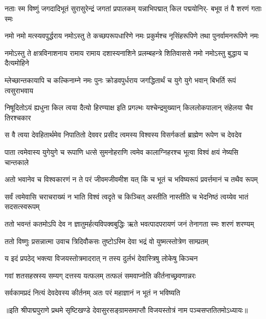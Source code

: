 
\addtocounter{shlokacount}{88}

\fourlineindentedshloka
{नताः स्म विष्णुं जगदादिभूतं}
{सुरासुरेन्द्रं जगतां प्रपालकम्}
{यन्नाभिपद्मात् किल पद्मयोनिर्-}
{बभूव तं वै शरणं गताः स्मः} %

\fourlineindentedshloka
{नमो नमो मत्स्यवपुर्द्धराय}
{नमोऽस्तु ते कच्छपरूपधारिणे}
{नमः प्रकुर्मश्च नृसिंहरूपिणे}
{तथा पुनर्वामनरूपिणे नमः} %

\fourlineindentedshloka
{नमोऽस्तु ते क्षत्रविनाशनाय}
{रामाय रामाय दशास्यनाशिने}
{प्रलम्बहन्त्रे शितिवाससे नमो}
{नमोऽस्तु बुद्धाय च दैत्यमोहिने} %

\fourlineindentedshloka
{म्लेच्छान्तकायापि च कल्किनाम्ने}
{नमः पुनः क्रोडवपुर्धराय}
{जगद्धितार्थं च युगे युगे भवान्}
{बिभर्ति रूपं त्वसुराभवाय} %

\fourlineindentedshloka
{निषूदितोऽयं ह्यधुना किल त्वया}
{दैत्यो हिरण्याक्ष इति प्रगल्भः}
{यश्चेन्द्रमुख्यान् किललोकपालान्}
{संहेलया चैव तिरश्चकार} %

\fourlineindentedshloka
{स वै त्वया देवहितार्थमेव}
{निपातितो देववर प्रसीद}
{त्वमस्य विश्वस्य विसर्गकर्ता}
{ब्राह्मेण रूपेण च देवदेव} %

\fourlineindentedshloka
{पाता त्वमेवास्य युगेयुगे च}
{रूपाणि धत्से सुमनोहराणि}
{त्वमेव कालाग्निहरश्च भूत्वा}
{विश्वं क्षयं नेष्यसि चान्तकाले} %

\fourlineindentedshloka
{अतो भवानेव च विश्वकारणं}
{न ते परं जीवमजीवमीश}
{यत् किं च भूतं च भविष्यरूपं}
{प्रवर्त्तमानं च तथैव रूपम्} %

\fourlineindentedshloka
{सर्वं त्वमेवासि चराचराख्यं}
{न भाति विश्वं त्वदृते च किञ्चित्}
{अस्तीति नास्तीति च भेदनिष्ठं}
{त्वय्येव भातं सदसत्स्वरूपम्} %

\fourlineindentedshloka
{ततो भवन्तं कतमोऽपि देव}
{न ज्ञातुमर्हत्यविपक्वबुद्धिः}
{ऋते भवत्पादपरायणं जनं}
{तेनागता स्मः शरणं शरण्यम्} %


\twolineshloka
{ततो विष्णुः प्रसन्नात्मा उवाच त्रिदिवौकसः}
{तुष्टोऽस्मि देवा भद्रं वो युष्मत्स्तोत्रेण साम्प्रतम्} %

\twolineshloka
{य इदं प्रपठेद् भक्त्या विजयस्तोत्रमादरात्}
{न तस्य दुर्लभं देवास्त्रिषु लोकेषु किञ्चन} %

\twolineshloka
{गवां शतसहस्रस्य सम्यग् दत्तस्य यत्फलम्}
{तत्फलं समवाप्नोति कीर्तनाच्छ्रवणान्नरः} %

\twolineshloka
{सर्वकामप्रदं नित्यं देवदेवस्य कीर्तनम्}
{अतः परं महाज्ञानं न भूतं न भविष्यति} %

॥इति श्रीपाद्मपुराणे प्रथमे सृष्टिखण्डे देवासुरसङ्ग्रामसमाप्तौ विजयस्तोत्रं नाम पञ्चसप्ततितमोऽध्यायः॥ %